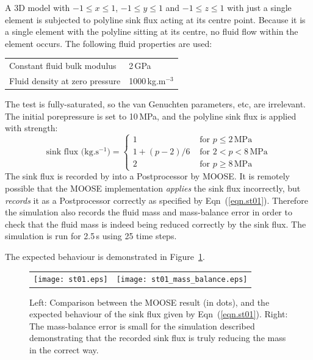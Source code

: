 \documentclass[]{scrreprt}
\begin{document}
A 3D model with $-1\leq x \leq 1$, $-1\leq y \leq 1$ and $-1\leq z
\leq 1$ with just a
single element is subjected to polyline sink flux acting at its
centre point.  Because it is a single element with the polyline
sitting at its centre, no fluid flow within the
element occurs.  The following fluid properties are used:
\begin{center}
\begin{tabular}{|ll|}
\hline
Constant fluid bulk modulus & 2\,GPa \\
Fluid density at zero pressure & 1000\,kg.m$^{-3}$ \\
\hline
\end{tabular} 
\end{center}
The test is fully-saturated, so the van Genuchten parameters, etc, are
irrelevant.  The initial porepressure is set to 10\,MPa, and the
polyline sink flux is applied with strength:
\begin{equation}
\mbox{sink flux (kg.s$^{-1}$)} = \left\{
\begin{array}{ll}
1 & \mbox{ for } p \leq 2\,\mbox{MPa} \\
1 + (p - 2)/6 & \mbox{ for } 2<p<8\,\mbox{MPa} \\
2 & \mbox{ for } p\geq 8\,\mbox{MPa}
\end{array}
\right.
\label{eqn.st01}
\end{equation}
The sink flux is recorded by into a Postprocessor by MOOSE.  It is
remotely possible that the MOOSE implementation {\em applies} the sink
flux incorrectly, but {\em records} it as a Postprocessor correctly as
specified by Eqn~(\ref{eqn.st01}).  Therefore the simulation also
records the fluid mass and mass-balance error in order to check that
the fluid mass is indeed being reduced correctly by the sink flux.
The simulation is run for 2.5\,s using 25 time steps.

The expected behaviour is demonstrated in Figure~\ref{st01.fig}.

\begin{figure}[htb]
\centering
\begin{tabular}{cc}
\texttt{[image: st01.eps]} &
\texttt{[image: st01\_mass\_balance.eps]}
\end{tabular}
\caption{Left: Comparison between the MOOSE result (in dots), and the
  expected behaviour of the sink flux given by Eqn~(\ref{eqn.st01}).
  Right: The mass-balance error is small for the simulation described
  demonstrating that the recorded sink flux is truly reducing the mass
  in the correct way.}
\label{st01.fig}
\end{figure}
\end{document}
